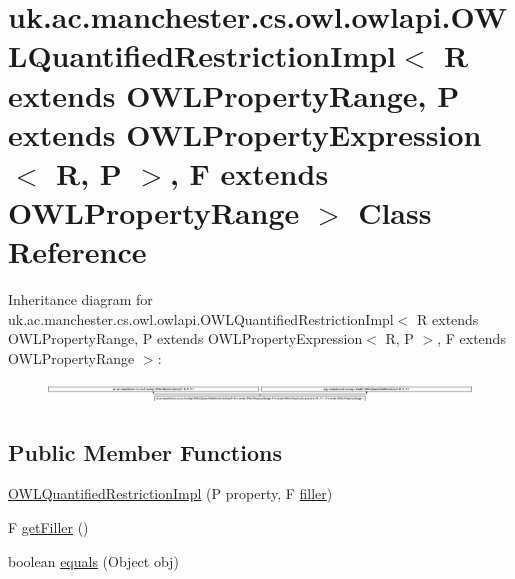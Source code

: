 \hypertarget{classuk_1_1ac_1_1manchester_1_1cs_1_1owl_1_1owlapi_1_1_o_w_l_quantified_restriction_impl_3_01_r_e04a97c08083d9e3c6f10e535b1571d1}{\section{uk.\-ac.\-manchester.\-cs.\-owl.\-owlapi.\-O\-W\-L\-Quantified\-Restriction\-Impl$<$ R extends O\-W\-L\-Property\-Range, P extends O\-W\-L\-Property\-Expression$<$ R, P $>$, F extends O\-W\-L\-Property\-Range $>$ Class Reference}
\label{classuk_1_1ac_1_1manchester_1_1cs_1_1owl_1_1owlapi_1_1_o_w_l_quantified_restriction_impl_3_01_r_e04a97c08083d9e3c6f10e535b1571d1}
}
Inheritance diagram for uk.\-ac.\-manchester.\-cs.\-owl.\-owlapi.\-O\-W\-L\-Quantified\-Restriction\-Impl$<$ R extends O\-W\-L\-Property\-Range, P extends O\-W\-L\-Property\-Expression$<$ R, P $>$, F extends O\-W\-L\-Property\-Range $>$\-:\begin{figure}[H]
\begin{center}
\leavevmode
\includegraphics[height=0.554455cm]{classuk_1_1ac_1_1manchester_1_1cs_1_1owl_1_1owlapi_1_1_o_w_l_quantified_restriction_impl_3_01_r_e04a97c08083d9e3c6f10e535b1571d1}
\end{center}
\end{figure}
\subsection*{Public Member Functions}
\begin{DoxyCompactItemize}
\item 
\hyperlink{classuk_1_1ac_1_1manchester_1_1cs_1_1owl_1_1owlapi_1_1_o_w_l_quantified_restriction_impl_3_01_r_e04a97c08083d9e3c6f10e535b1571d1_a265152a0a7333ee1dd392aa7403f44d4}{O\-W\-L\-Quantified\-Restriction\-Impl} (P property, F \hyperlink{classuk_1_1ac_1_1manchester_1_1cs_1_1owl_1_1owlapi_1_1_o_w_l_quantified_restriction_impl_3_01_r_e04a97c08083d9e3c6f10e535b1571d1_a5a244acc172337d0ead6badb3722fc93}{filler})
\item 
F \hyperlink{classuk_1_1ac_1_1manchester_1_1cs_1_1owl_1_1owlapi_1_1_o_w_l_quantified_restriction_impl_3_01_r_e04a97c08083d9e3c6f10e535b1571d1_a58122d8debd2ad4cdea571727d13c5b6}{get\-Filler} ()
\item 
boolean \hyperlink{classuk_1_1ac_1_1manchester_1_1cs_1_1owl_1_1owlapi_1_1_o_w_l_quantified_restriction_impl_3_01_r_e04a97c08083d9e3c6f10e535b1571d1_a1c1fe6e28e99cc74247e27347b02ccca}{equals} (Object obj)
\end{DoxyCompactItemize}
